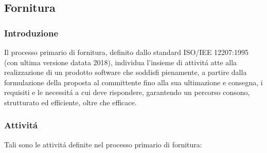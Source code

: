 
\subsection{Fornitura}
\subsubsection{Introduzione}
Il processo primario di fornitura, definito dallo standard ISO/IEE 12207:1995 (con ultima versione datata 2018), individua l'insieme di attivitá atte alla realizzazione di un prodotto software che soddisfi pienamente, a partire dalla formulazione della proposta al committente fino alla sua ultimazione e consegna, i requisiti e le necessitá a cui deve rispondere, garantendo un percorso consono, strutturato ed efficiente, oltre che efficace.

\subsubsection{Attivitá}
Tali sono le attivitá definite nel processo primario di fornitura:

